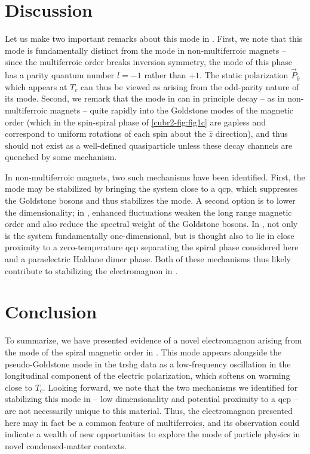 \section{Discussion}
Let us make two important remarks about this mode in .
First, we note that this mode is fundamentally distinct from the \higgs mode in non-multiferroic magnets -- since the multiferroic order breaks inversion symmetry, the \higgs mode of this phase has a parity quantum number $l=-1$ rather than $+1$.
The static polarization $\vec{P}_0$ which appears at $T_c$ can thus be viewed as arising from the odd-parity nature of its \higgs mode.
Second, we remark that the \higgs mode in  can in principle decay -- as in non-multiferroic magnets -- quite rapidly into the Goldstone modes of the magnetic order (which in the spin-spiral phase of \cref{cubr2-fig:fig1c} are gapless and correspond to uniform rotations of each spin about the $\hat{z}$ direction), and thus should not exist as a well-defined quasiparticle unless these decay channels are quenched by some mechanism.

In non-multiferroic magnets, two such mechanisms have been identified.
First, the \higgs mode may be stabilized by bringing the system close to a \gls{qcp}\cite{ruegg_quantum_2008,jain_higgs_2017,hong_higgs_2017,su_stable_2020}, which suppresses the Goldstone bosons and thus stabilizes the \higgs mode.
A second option is to lower the dimensionality\cite{canali_theory_1992,affleck_longitudinal_1992,schulz_dynamics_1996,essler_quasi-one-dimensional_1997,zhou_amplitude_2021}; in \oned, enhanced fluctuations weaken the long range magnetic order and also reduce the spectral weight of the Goldstone bosons\cite{zhou_amplitude_2021}. 
In , not only is the system fundamentally one-dimensional, but is thought also to lie in close proximity to a zero-temperature \gls{qcp}\cite{furukawa_ground-state_2012} separating the spiral phase considered here and a paraelectric Haldane dimer phase.
Both of these mechanisms thus likely contribute to stabilizing the \higgs electromagnon in .

\section{Conclusion}
To summarize, we have presented evidence of a novel electromagnon arising from the \higgs mode of the spiral magnetic order in .
This mode appears alongside the pseudo-Goldstone mode in the \gls{trshg} data as a low-frequency oscillation in the longitudinal component of the electric polarization, which softens on warming close to $T_c$.
Looking forward, we note that the two mechanisms we identified for stabilizing this mode in  -- low dimensionality and potential proximity to a \gls{qcp} -- are not necessarily unique to this material.
Thus, the \higgs electromagnon presented here may in fact be a common feature of \oned multiferroics, and its observation could indicate a wealth of new opportunities to explore the \higgs mode of particle physics in novel condensed-matter contexts.

